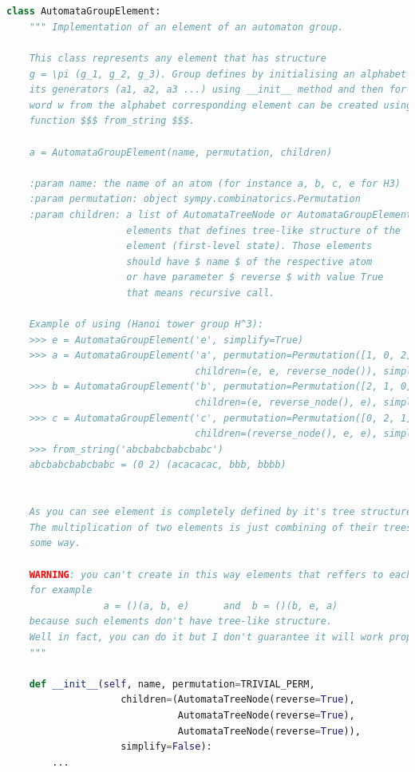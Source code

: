 \documentclass[a4paper,12pt]{amsart}
\begin{document}
\begin{appendices}
\newpage

\begin{lstlisting}[language=python, basicstyle=\tiny]


class AutomataGroupElement:
    """ Implementation of an element of an automaton group.

    This class represents any element that has structure
    g = \pi (g_1, g_2, g_3). Group defines by initialising an alphabet of
    its generators (a1, a2, a3 ...) using __init__ method and then for every
    word w from the alphabet corresponding element can be created using
    function $$$ from_string $$$.

    a = AutomataGroupElement(name, permutation, children)

    :param name: the name of an atom (for instance a, b, c, e for H3)
    :param permutation: object sympy.combinatorics.Permutation
    :param children: a list of AutomataTreeNode or AutomataGroupElement
                     elements that defines tree-like structure of the
                     element (first-level state). Those elements
                     should have $ name $ of the respective atom
                     or have parameter $ reverse $ with value True
                     that means recursive call.

    Example of using (Hanoi tower group H^3):
    >>> e = AutomataGroupElement('e', simplify=True)
    >>> a = AutomataGroupElement('a', permutation=Permutation([1, 0, 2]), \
                                 children=(e, e, reverse_node()), simplify=True)
    >>> b = AutomataGroupElement('b', permutation=Permutation([2, 1, 0]), \
                                 children=(e, reverse_node(), e), simplify=True)
    >>> c = AutomataGroupElement('c', permutation=Permutation([0, 2, 1]), \
                                 children=(reverse_node(), e, e), simplify=True)
    >>> from_string('abcbabcbabcbabc')
    abcbabcbabcbabc = (0 2) (acacacac, bbb, bbbb)


    As you can see element is completely defined by it's tree structure.
    The multiplication of two elements is just combining of their trees in
    some way.

    WARNING: you can't create in this way elements that reffers to each other,
    for example
                 a = ()(a, b, e)      and  b = ()(b, e, a)
    because such elements don't have tree-like structure.
    Well in fact, you can do it but I don't guarantee it will work properly.
    """

    def __init__(self, name, permutation=TRIVIAL_PERM,
                    children=(AutomataTreeNode(reverse=True),
                              AutomataTreeNode(reverse=True),
                              AutomataTreeNode(reverse=True)),
                    simplify=False):
        ...


\end{lstlisting}
\end{appendices}
\end{document}
